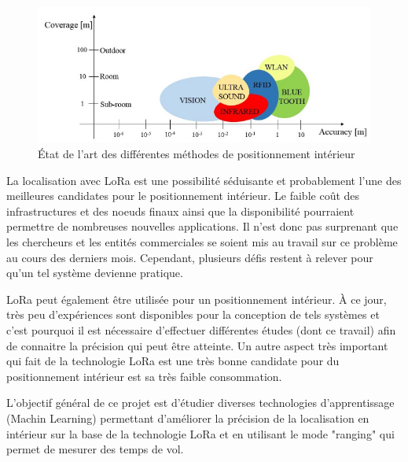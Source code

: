 \begin{figure}[htp]
 \begin{center}
  \includegraphics[scale=0.7]{figures/MethodePos.png}
  \caption{État de l'art des différentes méthodes de positionnement intérieur \cite{INPOS}}
  \label{fig:MethodePos} %
 \end{center}
\end{figure}

La localisation avec LoRa est une possibilité séduisante et probablement l'une des meilleures candidates pour le positionnement intérieur. Le faible coût des infrastructures et des noeuds finaux ainsi que la disponibilité pourraient permettre de nombreuses nouvelles applications. Il n’est donc pas surprenant que les chercheurs et les entités commerciales se soient mis au travail sur ce problème au cours des derniers mois. Cependant, plusieurs défis restent à relever pour qu'un tel système devienne pratique.

LoRa peut également être utilisée pour un positionnement intérieur. À ce jour, très peu d’expériences sont disponibles pour la conception de tels systèmes et c'est pourquoi il est nécessaire d'effectuer différentes études (dont ce travail) afin de connaitre la précision qui peut être atteinte. Un autre aspect très important qui fait de la technologie LoRa est une très bonne candidate pour du positionnement intérieur est sa très faible consommation. 


L’objectif général de ce projet est d'étudier diverses technologies d'apprentissage (Machin Learning) permettant d'améliorer la précision de la localisation en intérieur sur la base de la technologie LoRa et en utilisant le mode "ranging" qui permet de mesurer des temps de vol. 


